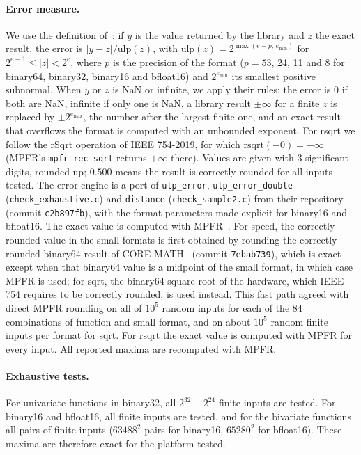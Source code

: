 \documentclass[11pt,a4paper]{article}
\begin{document}
\paragraph{Error measure.} We use the definition of~\cite{GIMOZ2026}: if $y$ is the value returned by the library and $z$ the exact result, the error is $|y-z|/\mathrm{ulp}(z)$, with $\mathrm{ulp}(z)=2^{\max(e-p,\,e_{\min})}$ for $2^{e-1}\le|z|<2^e$, where $p$ is the precision of the format ($p=53$, 24, 11 and 8 for binary64, binary32, binary16 and bfloat16) and $2^{e_{\min}}$ its smallest positive subnormal. When $y$ or $z$ is NaN or infinite, we apply their rules: the error is 0 if both are NaN, infinite if only one is NaN, a library result $\pm\infty$ for a finite $z$ is replaced by $\pm 2^{e_{\max}}$, the number after the largest finite one, and an exact result that overflows the format is computed with an unbounded exponent. For rsqrt we follow the rSqrt operation of IEEE 754-2019, for which $\mathrm{rsqrt}(-0)=-\infty$ (MPFR's \texttt{mpfr\_rec\_sqrt} returns $+\infty$ there). Values are given with 3 significant digits, rounded up; $0.500$ means the result is correctly rounded for all inputs tested. The error engine is a port of \texttt{ulp\_error}, \texttt{ulp\_error\_double} (\texttt{check\_exhaustive.c}) and \texttt{distance} (\texttt{check\_sample2.c}) from their repository (commit \texttt{c2b897fb}), with the format parameters made explicit for binary16 and bfloat16. The exact value is computed with MPFR~\cite{MPFR2007}. For speed, the correctly rounded value in the small formats is first obtained by rounding the correctly rounded binary64 result of CORE-MATH~\cite{CoreMath2022} (commit \texttt{7ebab739}), which is exact except when that binary64 value is a midpoint of the small format, in which case MPFR is used; for sqrt, the binary64 square root of the hardware, which IEEE 754 requires to be correctly rounded, is used instead. This fast path agreed with direct MPFR rounding on all of $10^5$ random inputs for each of the 84 combinations of function and small format, and on about $10^5$ random finite inputs per format for sqrt. For rsqrt the exact value is computed with MPFR for every input. All reported maxima are recomputed with MPFR.

\paragraph{Exhaustive tests.} For univariate functions in binary32, all $2^{32}-2^{24}$ finite inputs are tested. For binary16 and bfloat16, all finite inputs are tested, and for the bivariate functions all pairs of finite inputs ($63488^2$ pairs for binary16, $65280^2$ for bfloat16). These maxima are therefore exact for the platform tested.
\end{document}
